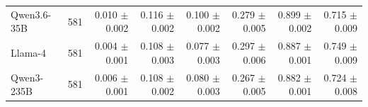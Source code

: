 \begin{table}[t]
\begin{tabular*}{\textwidth}{@{\extracolsep{\fill}}lrrrrrrr@{}}
Qwen3.6-35B & 581 & \shortstack[r]{0.010\\{\scriptsize $\pm$0.002}} & \shortstack[r]{0.116\\{\scriptsize $\pm$0.002}} & \shortstack[r]{0.100\\{\scriptsize $\pm$0.002}} & \shortstack[r]{0.279\\{\scriptsize $\pm$0.005}} & \shortstack[r]{0.899\\{\scriptsize $\pm$0.002}} & \shortstack[r]{0.715\\{\scriptsize $\pm$0.009}} \\
Llama-4 & 581 & \shortstack[r]{0.004\\{\scriptsize $\pm$0.001}} & \shortstack[r]{0.108\\{\scriptsize $\pm$0.003}} & \shortstack[r]{0.077\\{\scriptsize $\pm$0.003}} & \shortstack[r]{0.297\\{\scriptsize $\pm$0.006}} & \shortstack[r]{0.887\\{\scriptsize $\pm$0.001}} & \shortstack[r]{0.749\\{\scriptsize $\pm$0.009}} \\
Qwen3-235B & 581 & \shortstack[r]{0.006\\{\scriptsize $\pm$0.001}} & \shortstack[r]{0.108\\{\scriptsize $\pm$0.002}} & \shortstack[r]{0.080\\{\scriptsize $\pm$0.003}} & \shortstack[r]{0.267\\{\scriptsize $\pm$0.005}} & \shortstack[r]{0.882\\{\scriptsize $\pm$0.001}} & \shortstack[r]{0.724\\{\scriptsize $\pm$0.008}} \\
\bottomrule
\end{tabular*}
\end{table}
